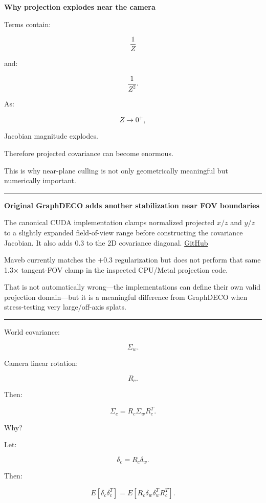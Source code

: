 \textbf{Why projection explodes near the camera}

Terms contain:

\[
\frac1Z
\]

and:

\[
\frac1{Z^2}.
\]

As:

\[
Z\rightarrow0^+,
\]

Jacobian magnitude explodes.

Therefore projected covariance can become enormous.

This is why near-plane culling is not only geometrically meaningful but numerically important.

\begin{center}\rule{0.5\linewidth}{0.5pt}\end{center}

\textbf{Original GraphDECO adds another stabilization near FOV boundaries}

The canonical CUDA implementation clamps normalized projected \(x/z\) and \(y/z\) to a slightly expanded field-of-view range before constructing the covariance Jacobian. It also adds \(0.3\) to the 2D covariance diagonal. \href{https://github.com/graphdeco-inria/diff-gaussian-rasterization/blob/main/cuda_rasterizer/forward.cu?utm_source=chatgpt.com}{GitHub}

Maveb currently matches the \(+0.3\) regularization but does not perform that same 1.3× tangent-FOV clamp in the inspected CPU/Metal projection code.

That is not automatically wrong---the implementations can define their own valid projection domain---but it is a meaningful difference from GraphDECO when stress-testing very large/off-axis splats.

\begin{center}\rule{0.5\linewidth}{0.5pt}\end{center}

World covariance:

\[
\Sigma_w.
\]

Camera linear rotation:

\[
R_c.
\]

Then:

\[
\boxed{
\Sigma_c
=
R_c
\Sigma_w
R_c^T.
}
\]

Why?

Let:

\[
\delta_c
=
R_c\delta_w.
\]

Then:

\[
E[
\delta_c
\delta_c^T
]
=
E[
R_c
\delta_w
\delta_w^T
R_c^T
].
\]

